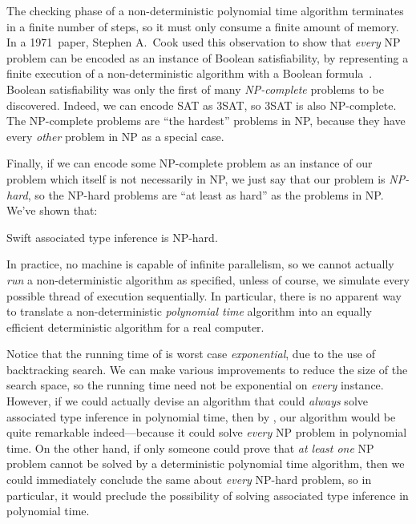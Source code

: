\documentclass[../generics]{subfiles}
\begin{document}
The checking phase of a non-deterministic polynomial time algorithm terminates in a finite number of steps, so it must only consume a finite amount of memory. In a 1971~paper, Stephen A.~Cook used this observation to show that \emph{every} NP problem can be encoded as an instance of Boolean satisfiability, by representing a finite execution of a non-deterministic algorithm with a Boolean formula~\cite{cook}. Boolean satisfiability was only the first of many \emph{NP-complete} problems to be discovered. Indeed, we can encode SAT as 3SAT, so 3SAT is also NP-complete. The NP-complete problems are ``the hardest'' problems in NP, because they have every \emph{other} problem in NP as a special case.

Finally, if we can encode some NP-complete problem as an instance of our problem which itself is not necessarily in NP, we just say that our problem is \emph{NP-hard}, so the NP-hard problems are ``at least as hard'' as the problems in NP. We've shown that:

\begin{theorem}\label{assoc np hard}
Swift associated type inference is NP-hard.
\end{theorem}

In practice, no machine is capable of infinite parallelism, so we cannot actually \emph{run} a non-deterministic algorithm as specified, unless of course, we simulate every possible thread of execution sequentially. In particular, there is no apparent way to translate a non-deterministic \emph{polynomial time} algorithm into an equally efficient deterministic algorithm for a real computer.

Notice that the running time of  is worst case \emph{exponential}, due to the use of backtracking search. We can make various improvements to reduce the size of the search space, so the running time need not be exponential on \emph{every} instance. However, if we could actually devise an algorithm that could \emph{always} solve associated type inference in polynomial time, then by , our algorithm would be quite remarkable indeed---because it could solve \emph{every} NP problem in polynomial time. On the other hand, if only someone could prove that \emph{at least one} NP problem cannot be solved by a deterministic polynomial time algorithm, then we could immediately conclude the same about \emph{every} NP-hard problem, so in particular, it would preclude the possibility of solving associated type inference in polynomial time.
\end{document}
